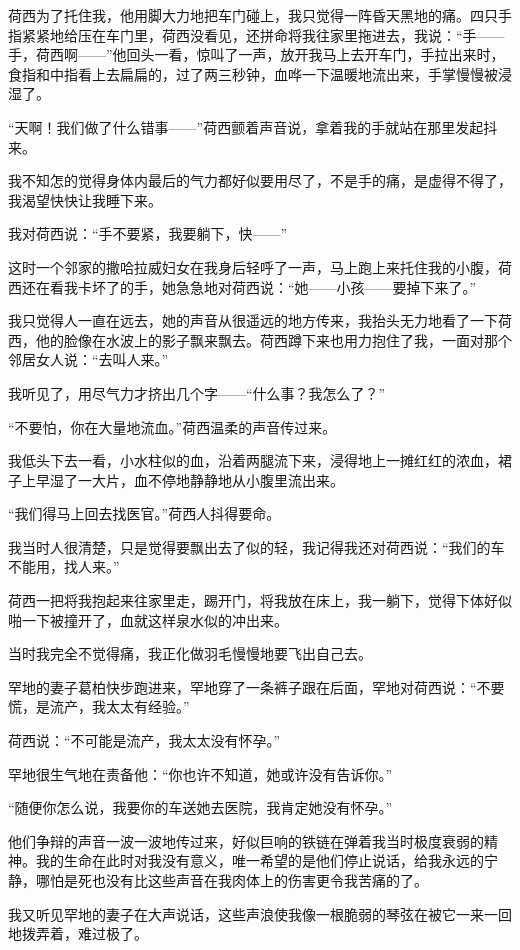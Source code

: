 \par 荷西为了托住我，他用脚大力地把车门碰上，我只觉得一阵昏天黑地的痛。四只手指紧紧地给压在车门里，荷西没看见，还拼命将我往家里拖进去，我说：“手——手，荷西啊——”他回头一看，惊叫了一声，放开我马上去开车门，手拉出来时，食指和中指看上去扁扁的，过了两三秒钟，血哗一下温暖地流出来，手掌慢慢被浸湿了。
\par “天啊！我们做了什么错事——”荷西颤着声音说，拿着我的手就站在那里发起抖来。
\par 我不知怎的觉得身体内最后的气力都好似要用尽了，不是手的痛，是虚得不得了，我渴望快快让我睡下来。
\par 我对荷西说：“手不要紧，我要躺下，快——”
\par 这时一个邻家的撒哈拉威妇女在我身后轻呼了一声，马上跑上来托住我的小腹，荷西还在看我卡坏了的手，她急急地对荷西说：“她——小孩——要掉下来了。”
\par 我只觉得人一直在远去，她的声音从很遥远的地方传来，我抬头无力地看了一下荷西，他的脸像在水波上的影子飘来飘去。荷西蹲下来也用力抱住了我，一面对那个邻居女人说：“去叫人来。”
\par 我听见了，用尽气力才挤出几个字——“什么事？我怎么了？”
\par “不要怕，你在大量地流血。”荷西温柔的声音传过来。
\par 我低头下去一看，小水柱似的血，沿着两腿流下来，浸得地上一摊红红的浓血，裙子上早湿了一大片，血不停地静静地从小腹里流出来。
\par “我们得马上回去找医官。”荷西人抖得要命。
\par 我当时人很清楚，只是觉得要飘出去了似的轻，我记得我还对荷西说：“我们的车不能用，找人来。”
\par 荷西一把将我抱起来往家里走，踢开门，将我放在床上，我一躺下，觉得下体好似啪一下被撞开了，血就这样泉水似的冲出来。
\par 当时我完全不觉得痛，我正化做羽毛慢慢地要飞出自己去。
\par 罕地的妻子葛柏快步跑进来，罕地穿了一条裤子跟在后面，罕地对荷西说：“不要慌，是流产，我太太有经验。”
\par 荷西说：“不可能是流产，我太太没有怀孕。”
\par 罕地很生气地在责备他：“你也许不知道，她或许没有告诉你。”
\par “随便你怎么说，我要你的车送她去医院，我肯定她没有怀孕。”
\par 他们争辩的声音一波一波地传过来，好似巨响的铁链在弹着我当时极度衰弱的精神。我的生命在此时对我没有意义，唯一希望的是他们停止说话，给我永远的宁静，哪怕是死也没有比这些声音在我肉体上的伤害更令我苦痛的了。
\par 我又听见罕地的妻子在大声说话，这些声浪使我像一根脆弱的琴弦在被它一来一回地拨弄着，难过极了。
